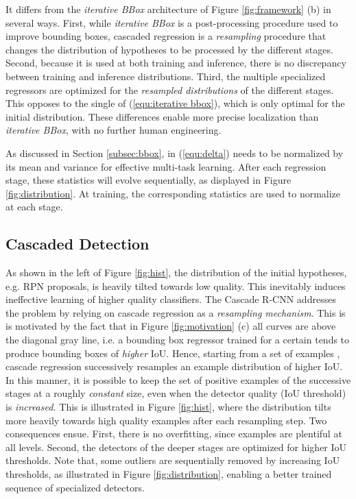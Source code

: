 \documentclass[10pt,twocolumn,letterpaper]{article}
\begin{document}
It differs from the \textit{iterative BBox} architecture of
Figure \ref{fig:framework} (b) in several ways. First,
while \textit{iterative BBox} is a post-processing procedure used to
improve bounding boxes, cascaded regression is a {\it resampling\/}
procedure that changes the distribution of hypotheses to be processed
by the different
stages. Second, because it is used at both training and inference, there is
no discrepancy between training and inference distributions. Third,
the multiple specialized regressors  are
optimized for the {\it resampled distributions\/} of the different stages.
This opposes to the single  of (\ref{equ:iterative bbox}),
which is only optimal for the initial distribution. These differences enable
more precise localization than \textit{iterative BBox}, with no further
human engineering.

As discussed in Section \ref{subsec:bbox},  in (\ref{equ:delta}) needs to be normalized by its mean and variance for effective multi-task learning. After each regression stage, these statistics will evolve sequentially, as displayed in Figure \ref{fig:distribution}. At training, the corresponding statistics are used to normalize  at each stage.


\subsection{Cascaded Detection}
\label{subsec:cascade}

As shown in the left of Figure \ref{fig:hist}, the distribution of
the initial hypotheses, e.g. RPN proposals, is heavily tilted towards low
quality. This inevitably induces ineffective learning of higher quality
classifiers. The Cascade R-CNN addresses the problem by
relying on cascade regression as a {\it resampling mechanism\/}. This is
is motivated by the fact that in Figure \ref{fig:motivation} (c) all curves are
above the diagonal gray line, i.e. a bounding box regressor trained for a
certain  tends to produce bounding boxes of {\it higher\/} IoU. Hence,
starting from a set of examples , cascade regression
successively resamples an example distribution  of
higher IoU. In this manner, it is possible to keep the set of positive
examples of the successive stages at a roughly {\it constant\/} size,
even when the detector quality (IoU threshold) is {\it increased.\/} This is
illustrated in Figure \ref{fig:hist}, where the distribution tilts more
heavily towards high quality examples after each resampling step. Two
consequences ensue. First, there is no overfitting, since examples
are plentiful at all levels. Second, the detectors of the deeper
stages are optimized for higher IoU thresholds. Note that, some outliers
are sequentially removed by  increasing IoU thresholds, as illustrated in Figure \ref{fig:distribution}, enabling a better trained sequence of specialized detectors.
\end{document}
